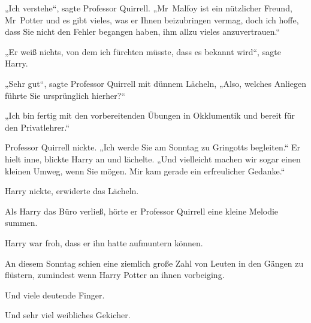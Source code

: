 „Ich verstehe“, sagte Professor Quirrell. „Mr~Malfoy ist ein nützlicher Freund, Mr~Potter und es gibt vieles, was er Ihnen beizubringen vermag, doch ich hoffe, dass Sie nicht den Fehler begangen haben, ihm allzu vieles anzuvertrauen.“

„Er weiß nichts, von dem ich fürchten müsste, dass es bekannt wird“, sagte Harry.

„Sehr gut“, sagte Professor Quirrell mit dünnem Lächeln, „Also, welches Anliegen führte Sie ursprünglich hierher?“

„Ich bin fertig mit den vorbereitenden Übungen in Okklumentik und bereit für den Privatlehrer.“

Professor Quirrell nickte. „Ich werde Sie am Sonntag zu Gringotts begleiten.“ Er hielt inne, blickte Harry an und lächelte. „Und vielleicht machen wir sogar einen kleinen Umweg, wenn Sie mögen. Mir kam gerade ein erfreulicher Gedanke.“

Harry nickte, erwiderte das Lächeln.

Als Harry das Büro verließ, hörte er Professor Quirrell eine kleine Melodie summen.

Harry war froh, dass er ihn hatte aufmuntern können.

\later

An diesem Sonntag schien eine ziemlich große Zahl von Leuten in den Gängen zu flüstern, zumindest wenn Harry Potter an ihnen vorbeiging.

Und viele deutende Finger.

Und sehr viel weibliches Gekicher.

